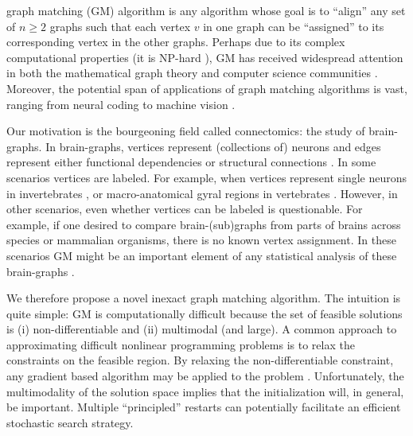 \documentclass[10pt,journal,cspaper,compsoc]{IEEEtran}
\begin{document}

 graph matching (GM) algorithm is any algorithm whose goal is to ``align'' any set of $n\geq 2$ graphs such that each vertex $v$ in one graph can be ``assigned'' to its corresponding vertex in the other graphs.  Perhaps due to its complex computational properties (it is NP-hard \cite{Garey1979}), GM has received widespread attention in both the mathematical graph theory and computer science communities \cite{Conte2004}.  Moreover, the potential span of applications of graph matching algorithms is vast, ranging from neural coding \cite{Richiardi2010} to machine vision \cite{Wiskott1997}.  

Our motivation is the bourgeoning field called connectomics: the study of brain-graphs.  In brain-graphs,  vertices represent (collections of) neurons and edges represent either functional dependencies or structural connections \cite{Sporns2010}.  In some scenarios vertices are labeled.  For example, when vertices represent single neurons in invertebrates \cite{WhiteBrenner86}, or macro-anatomical gyral regions in vertebrates \cite{Biswal2010,Bullmore2010}.  However, in other scenarios, even whether vertices can be labeled is questionable.  For example, if one desired to compare brain-(sub)graphs from parts of brains across species or mammalian organisms, there is no known vertex assignment.  In these scenarios GM might be an important element of any statistical analysis of these brain-graphs \cite{VP11_sigsub, VP11_unlabeled}.


We therefore propose a novel inexact graph matching algorithm.  The intuition is quite simple: GM is computationally difficult because the set of feasible solutions is  (i) non-differentiable  and (ii) multimodal  (and large).   A common approach to approximating difficult nonlinear programming problems is to relax the constraints on the feasible region.  By relaxing the non-differentiable constraint, any gradient based algorithm may be applied to the problem \cite{Mangasarian1987}. Unfortunately, the multimodality of the solution space implies that the initialization will, in general, be important.  Multiple ``principled'' restarts can potentially facilitate an efficient stochastic search strategy.  
\end{document}
